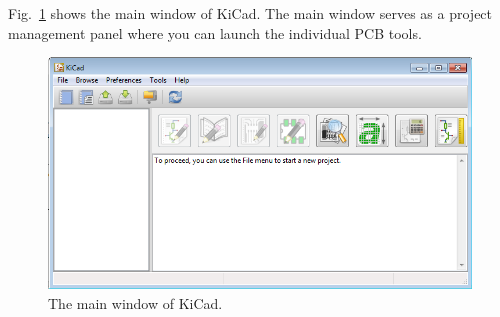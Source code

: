\documentclass[12pt,letterpaper]{scrartcl}
\begin{document}
Fig.~\ref{fig:kicad-main} shows the main window of KiCad. The main window serves as a project management panel where you can launch the individual PCB tools. 

\begin{figure}
\centering
\includegraphics[width=5in]{kicad-main.png}
\caption{The main window of KiCad.}
\label{fig:kicad-main}
\end{figure}
\end{document}
